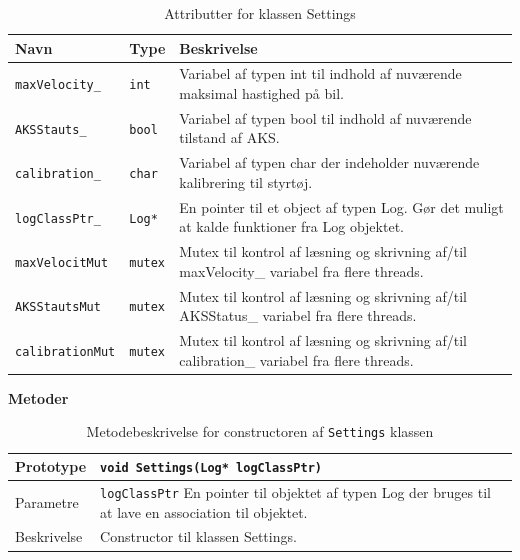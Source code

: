 \begin{table}[h]
\begin{tabularx}{\textwidth}{| L{3cm} | Z | L{10cm} |} \hline
Navn & Type & Beskrivelse \\\hline
\texttt{maxVelocity\_}			& \texttt{int}		&Variabel af typen int til indhold af nuværende maksimal hastighed på bil.\\\hline

\texttt{AKSStauts\_}			& \texttt{bool}		&Variabel af typen bool til indhold af nuværende tilstand af AKS.\\\hline

\texttt{calibration\_}			& \texttt{char}		&Variabel af typen char der indeholder nuværende kalibrering til styrtøj.\\\hline

\texttt{logClassPtr\_}			& \texttt{Log*}		&En pointer til et object af typen Log. Gør det muligt at kalde funktioner fra Log objektet.\\\hline

\texttt{maxVelocitMut}			& \texttt{mutex}	&Mutex til kontrol af læsning og skrivning af/til maxVelocity\_ variabel fra flere threads.\\\hline

\texttt{AKSStautsMut}			& \texttt{mutex}	&Mutex til kontrol af læsning og skrivning af/til AKSStatus\_ variabel fra flere threads.\\\hline

\texttt{calibrationMut}			& \texttt{mutex}	&Mutex til kontrol af læsning og skrivning af/til calibration\_ variabel fra flere threads.\\\hline
\end{tabularx}
\caption{Attributter for klassen Settings}
\label{table:attr_settings}
\end{table}

\clearpage

\textbf{Metoder}

\begin{table}[h]
\begin{tabularx}{\textwidth}{| L{2.5 cm} | Z |} \hline
Prototype 	& \texttt{void Settings(Log* logClassPtr)} \\\hline
Parametre 	& \texttt{logClassPtr} 		\newline En pointer til objektet af typen Log der bruges til at lave en association til objektet. \\\hline
Beskrivelse	& Constructor til klassen Settings. \newline \\\hline
\end{tabularx}
\caption{Metodebeskrivelse for constructoren af \texttt{Settings} klassen}
\label{table:met_settings}
\end{table}

